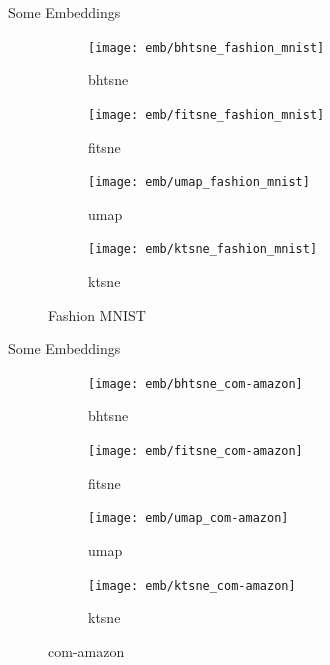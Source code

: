 \documentclass{beamer}
\begin{document}
\begin{frame}[fragile]{Some Embeddings}
    \vspace{-.5em}
    \begin{figure}[h]
        \centering
        \begin{subfigure}{0.3\textwidth}
            \texttt{[image: emb/bhtsne\_fashion\_mnist]}
            \caption{bhtsne}
            \vspace{-2em}
        \end{subfigure}
        \begin{subfigure}{0.3\textwidth}
            \texttt{[image: emb/fitsne\_fashion\_mnist]}
            \caption{fitsne}
            \vspace{-2em}
        \end{subfigure}
        \par\bigskip
        \begin{subfigure}{0.3\textwidth}
            \texttt{[image: emb/umap\_fashion\_mnist]}
            \caption{umap}
            \vspace{-1em}
        \end{subfigure}
        \begin{subfigure}{0.3\textwidth}
            \texttt{[image: emb/ktsne\_fashion\_mnist]}
            \caption{ktsne}
            \vspace{-1em}
        \end{subfigure}
        \caption{Fashion MNIST}
    \end{figure}
\end{frame}

\begin{frame}[fragile]{Some Embeddings}
    \vspace{-.5em}
    \begin{figure}[h]
        \centering
        \begin{subfigure}{0.3\textwidth}
            \texttt{[image: emb/bhtsne\_com-amazon]}
            \caption{bhtsne}
            \vspace{-2em}
        \end{subfigure}
        \begin{subfigure}{0.3\textwidth}
            \texttt{[image: emb/fitsne\_com-amazon]}
            \caption{fitsne}
            \vspace{-2em}
        \end{subfigure}
        \par\bigskip
        \begin{subfigure}{0.3\textwidth}
            \texttt{[image: emb/umap\_com-amazon]}
            \caption{umap}
            \vspace{-1em}
        \end{subfigure}
        \begin{subfigure}{0.3\textwidth}
            \texttt{[image: emb/ktsne\_com-amazon]}
            \caption{ktsne}
            \vspace{-1em}
        \end{subfigure}
        \caption{com-amazon}
    \end{figure}
\end{frame}
\end{document}
